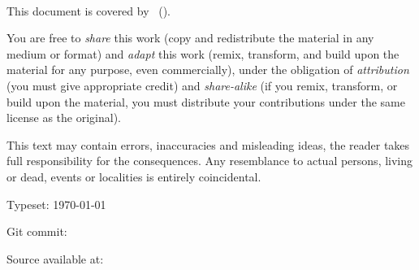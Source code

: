 
{\small
\setlength{\parindent}{0em}\setlength{\parskip}{1em}

~

\vfill


\doclicenseIcon
This document is covered by 
\doclicenseLongNameRef \ 
(\doclicenseNameRef).

You are free to 
\emph{share} this work (copy and redistribute the material in any medium or format) 
and 
\emph{adapt} this work (remix, transform, and build upon the material for any purpose, even commercially),
under the obligation of 
\emph{attribution} (you must give appropriate credit)
and
\emph{share-alike} (if you remix, transform, or build upon the material, you must distribute your contributions under the same license as the original). 

This text may contain errors, inaccuracies and misleading ideas, the reader takes full responsibility for the consequences. 
Any resemblance to actual persons, living or dead, events or localities is entirely coincidental.

Typeset: \today

Git commit: \commiturl

Source available at: \sourcelink
}
